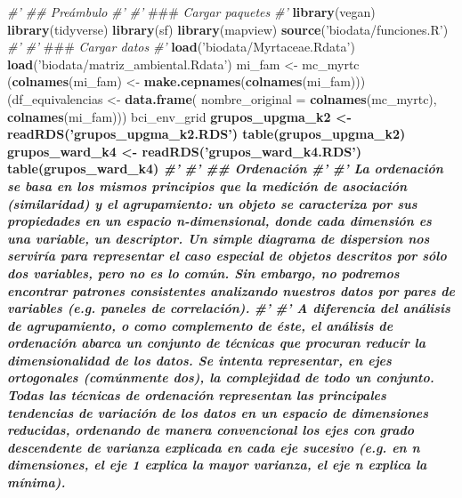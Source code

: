\documentclass[11pt,]{article}
\newenvironment{Shaded}{\begin{snugshade}}{\end{snugshade}}
\newcommand{\KeywordTok}[1]{\textcolor[rgb]{0.13,0.29,0.53}{\textbf{#1}}}
\newcommand{\DataTypeTok}[1]{\textcolor[rgb]{0.13,0.29,0.53}{#1}}
\newcommand{\StringTok}[1]{\textcolor[rgb]{0.31,0.60,0.02}{#1}}
\newcommand{\CommentTok}[1]{\textcolor[rgb]{0.56,0.35,0.01}{\textit{#1}}}
\newcommand{\OperatorTok}[1]{\textcolor[rgb]{0.81,0.36,0.00}{\textbf{#1}}}
\newcommand{\AlertTok}[1]{\textcolor[rgb]{0.94,0.16,0.16}{#1}}
\newcommand{\NormalTok}[1]{#1}
\begin{document}
\begin{Shaded}
\begin{Highlighting}[]
\CommentTok{#' ## Preámbulo}
\CommentTok{#' }
\CommentTok{#' }\AlertTok{###}\CommentTok{ Cargar paquetes}
\CommentTok{#' }
\KeywordTok{library}\NormalTok{(vegan)}
\KeywordTok{library}\NormalTok{(tidyverse)}
\KeywordTok{library}\NormalTok{(sf)}
\KeywordTok{library}\NormalTok{(mapview)}
\KeywordTok{source}\NormalTok{(}\StringTok{'biodata/funciones.R'}\NormalTok{)}
\CommentTok{#' }
\CommentTok{#' }\AlertTok{###}\CommentTok{ Cargar datos}
\CommentTok{#' }
\KeywordTok{load}\NormalTok{(}\StringTok{'biodata/Myrtaceae.Rdata'}\NormalTok{)}
\KeywordTok{load}\NormalTok{(}\StringTok{'biodata/matriz_ambiental.Rdata'}\NormalTok{)}
\NormalTok{mi_fam <-}\StringTok{ }\NormalTok{mc_myrtc}
\NormalTok{(}\KeywordTok{colnames}\NormalTok{(mi_fam) <-}\StringTok{ }\KeywordTok{make.cepnames}\NormalTok{(}\KeywordTok{colnames}\NormalTok{(mi_fam)))}
\NormalTok{(df_equivalencias <-}\StringTok{ }\KeywordTok{data.frame}\NormalTok{(}
  \DataTypeTok{nombre_original =} \KeywordTok{colnames}\NormalTok{(mc_myrtc),}
  \KeywordTok{colnames}\NormalTok{(mi_fam)))}
\NormalTok{bci_env_grid }\OperatorTok{%
\NormalTok{grupos_upgma_k2 <-}\StringTok{ }\KeywordTok{readRDS}\NormalTok{(}\StringTok{'grupos_upgma_k2.RDS'}\NormalTok{)}
\KeywordTok{table}\NormalTok{(grupos_upgma_k2)}
\NormalTok{grupos_ward_k4 <-}\StringTok{ }\KeywordTok{readRDS}\NormalTok{(}\StringTok{'grupos_ward_k4.RDS'}\NormalTok{)}
\KeywordTok{table}\NormalTok{(grupos_ward_k4)}
\CommentTok{#' }
\CommentTok{#' ## Ordenación}
\CommentTok{#' }
\CommentTok{#' La ordenación se basa en los mismos principios que la medición de asociación (similaridad) y el agrupamiento: un objeto se caracteriza por sus propiedades en un espacio n-dimensional, donde cada dimensión es una variable, un descriptor. Un simple diagrama de dispersion nos serviría para representar el caso especial de objetos descritos por sólo dos variables, pero no es lo común. Sin embargo, no podremos encontrar patrones consistentes analizando nuestros datos por pares de variables (e.g. paneles de correlación).}
\CommentTok{#' }
\CommentTok{#' A diferencia del análisis de agrupamiento, o como complemento de éste, el análisis de ordenación abarca un conjunto de técnicas que procuran reducir la dimensionalidad de los datos. Se intenta representar, en ejes ortogonales (comúnmente dos), la complejidad de todo un conjunto. Todas las técnicas de ordenación representan las principales tendencias de variación de los datos en un espacio de dimensiones reducidas, ordenando de manera convencional los ejes con grado descendente de varianza explicada en cada eje sucesivo (e.g. en n dimensiones, el eje 1 explica la mayor varianza, el eje n explica la mínima).}
}
\end{Highlighting}
\end{Shaded}
\end{document}
